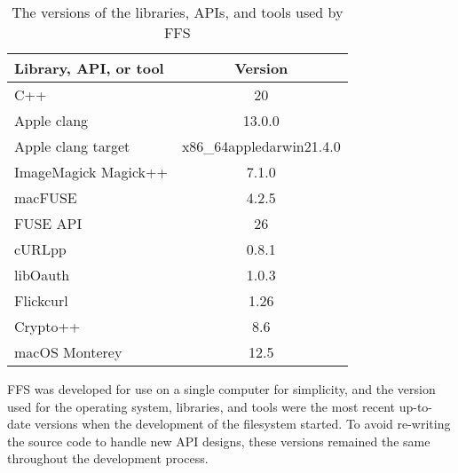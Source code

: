 \begin{table}[!ht]
	\begin{center}
		\caption{The versions of the libraries, \gls{API}s, and tools used by \gls{FFS}}
		\begin{tabular}{| l || c |}
			
			\hline

			\textbf{Library, \gls{API}, or tool} & \textbf{Version}\\
			
			\hline
			\hline
			
				C++						& 20 \\
				Apple clang 			& 13.0.0\\
				Apple clang target		& x86\_64\-apple\-darwin21.4.0\\
				ImageMagick Magick++	& 7.1.0\-29\\
				macFUSE					& 4.2.5 \\
				FUSE \gls{API}				& 26 \\
				cURLpp					& 0.8.1 \\
				libOauth				& 1.0.3 \\
				Flickcurl				& 1.26 \\
				Crypto++				& 8.6 \\
				macOS Monterey			& 12.5\\

			\hline
		\end{tabular}
		\label{tbl:dev_env}
	\end{center}

\end{table}

\gls{FFS} was developed for use on a single computer for simplicity, and the version used for the operating system, libraries, and tools were the most recent \mbox{up-to-date} versions when the development of the filesystem started. To avoid \mbox{re-writing} the source code to handle new \gls{API} designs, these versions remained the same throughout the development process.